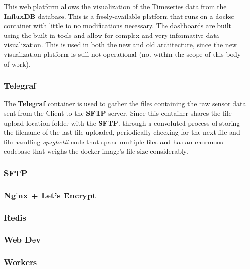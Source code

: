 This web platform allows the visualization of the Timeseries data from the \textbf{InfluxDB} database. This is a freely-available platform that runs on a docker container with little to no modifications necessary. The dashboards are built using the built-in tools and allow for complex and very informative data visualization. This is used in both the new and old architecture, since the new visualization platform is still not operational (not within the scope of this body of work).

\subsubsection{Telegraf}
\label{methodology:sss:telegraf}

The \textbf{Telegraf} container is used to gather the files containing the raw sensor data sent from the Client to the \textbf{SFTP} server. Since this container shares the file upload location folder with the \textbf{SFTP}, through a convoluted process of storing the filename of the last file uploaded, periodically checking for the next file and file handling \textit{spaghetti} code that spans multiple files and has an enormous codebase that weighs the docker image's file size considerably. 

\subsubsection{SFTP}
\label{methodology:sss:sftp}

\subsubsection{Nginx + Let's Encrypt}
\label{methodology:sss:nginxletsencrypt}

\subsubsection{Redis}
\label{methodology:sss:redis}

\subsubsection{Web Dev}
\label{methodology:sss:webdev}

\subsubsection{Workers}
\label{methodology:sss:workers}
